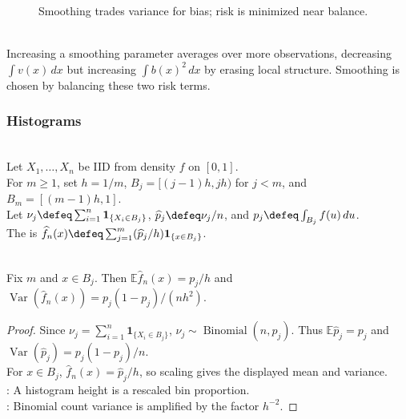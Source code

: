 \begin{figure}[H]
  \centering
  
  \caption{Smoothing trades variance for bias; risk is minimized near balance.}
  \label{fig:bias-variance-smoothing-tradeoff}
\end{figure}

\begin{principle} \label{princ:curve-estimation-smoothing-tradeoff} \\
Increasing a smoothing parameter averages over more observations, decreasing $\int v(x)\,dx$ but increasing $\int b(x)^2\,dx$ by erasing local structure.
Smoothing is chosen by balancing these two risk terms.
\end{principle}

\subsubsection{Histograms}

\begin{definition} \label{def:regular-histogram-density-estimator} \\
Let $X_1,\ldots,X_n$ be IID from density $f$ on $[0,1]$.\\
For $m\geq1$, set $h=1/m$, $B_j=[(j-1)h,jh)$ for $j<m$, and $B_m=[(m-1)h,1]$.\\
Let $\nu_j\defeq\sum_{i=1}^{n}\mathbf{1}_{\{X_i\in B_j\}}$, $\widehat p_j\defeq\nu_j/n$, and $p_j\defeq\int_{B_j}f(u)\,du$.\\
The  is $\widehat f_n(x)\defeq\sum_{j=1}^{m}(\widehat p_j/h)\mathbf{1}_{\{x\in B_j\}}$.
\end{definition}

\begin{proposition} \label{prop:histogram-pointwise-mean-variance} \\
Fix $m$ and $x\in B_j$. Then $\mathbb{E}\widehat f_n(x)=p_j/h$ and $\operatorname{Var}(\widehat f_n(x))=p_j(1-p_j)/(nh^2)$.
\begin{proof} Since $\nu_j=\sum_{i=1}^{n}\mathbf{1}_{\{X_i\in B_j\}}$, $\nu_j\sim\operatorname{Binomial}(n,p_j)$. Thus $\mathbb{E}\widehat p_j=p_j$ and $\operatorname{Var}(\widehat p_j)=p_j(1-p_j)/n$.\\
For $x\in B_j$, $\widehat f_n(x)=\widehat p_j/h$, so scaling gives the displayed mean and variance.\\
: A histogram height is a rescaled bin proportion.\\
: Binomial count variance is amplified by the factor $h^{-2}$.
\end{proof}
\end{proposition}

